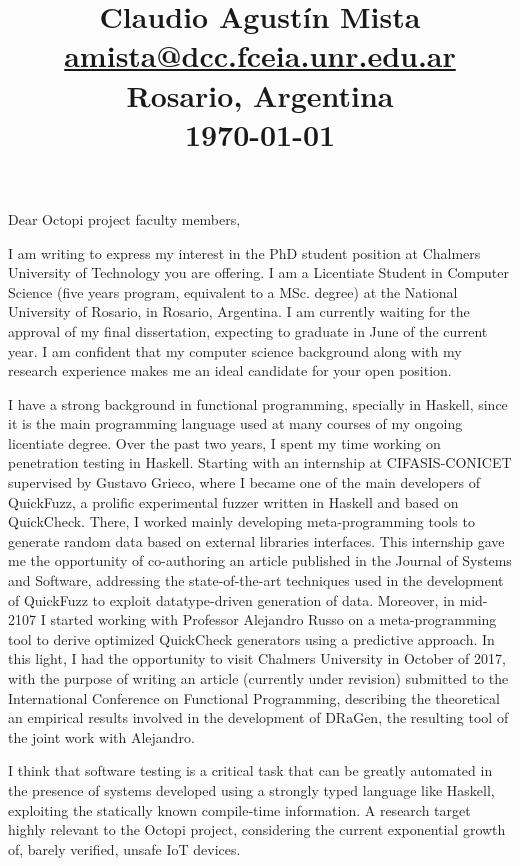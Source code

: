\documentclass[helvetica,notitle,flagCMYK,totpages,11pt]{europecv}
\title{
  \begin{flushright}
    \Large{Claudio Agustín Mista}\\
    \small{\url{amista@dcc.fceia.unr.edu.ar}}\\
    \small{Rosario, Argentina}\\
    \small{\today}
  \end{flushright}
  \vspace{-30pt}
}
\date{}
\begin{document}
\maketitle 

Dear Octopi project faculty members,

I am writing to express my interest in the PhD student position at Chalmers
University of Technology you are offering.
%
I am a Licentiate Student in Computer Science (five years program, equivalent to
a MSc. degree) at the National University of Rosario, in Rosario, Argentina.
%
I am currently waiting for the approval of my final dissertation, expecting to
graduate in June of the current year.
%
I am confident that my computer science background along with my research
experience makes me an ideal candidate for your open position.


I have a strong background in functional programming, specially in Haskell,
since it is the main programming language used at many courses of my ongoing
licentiate degree.
%
Over the past two years, I spent my time working on penetration testing in
Haskell. Starting with an internship at CIFASIS-CONICET supervised by Gustavo
Grieco, where I became one of the main developers of QuickFuzz, a prolific
experimental fuzzer written in Haskell and based on QuickCheck.
%
There, I worked mainly developing meta-programming tools to generate random data
based on external libraries interfaces.
%
This internship gave me the opportunity of co-authoring an article published in
the Journal of Systems and Software, addressing the state-of-the-art techniques
used in the development of QuickFuzz to exploit datatype-driven generation of
data.
%
Moreover, in mid-2107 I started working with Professor Alejandro Russo on a
meta-programming tool to derive optimized QuickCheck generators using a
predictive approach.
%
In this light, I had the opportunity to visit Chalmers University in October of
2017, with the purpose of writing an article (currently under revision)
submitted to the International Conference on Functional Programming, describing
the theoretical an empirical results involved in the development of DRaGen, the
resulting tool of the joint work with Alejandro.


I think that software testing is a critical task that can be greatly automated
in the presence of systems developed using a strongly typed language like
Haskell, exploiting the statically known compile-time information.
%
A research target highly relevant to the Octopi project, considering the current
exponential growth of, barely verified, unsafe IoT devices.
\end{document}

